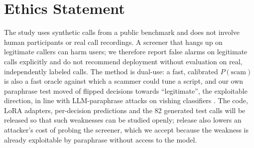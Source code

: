 \documentclass[11pt]{article}
\begin{document}
\section{Ethics Statement}

The study uses synthetic calls from a public benchmark and does not involve human participants or real call recordings. A screener that hangs up on legitimate callers can harm users; we therefore report false alarms on legitimate calls explicitly and do not recommend deployment without evaluation on real, independently labeled calls. The method is dual-use: a fast, calibrated $P(\text{scam})$ is also a fast oracle against which a scammer could tune a script, and our own paraphrase test moved \paratolegit{} of \paran{} flipped decisions towards ``legitimate'', the exploitable direction, in line with LLM-paraphrase attacks on vishing classifiers \citep{li2025phisher}. The code, LoRA adapters, per-decision predictions and the 82 generated test calls will be released so that such weaknesses can be studied openly; release also lowers an attacker's cost of probing the screener, which we accept because the weakness is already exploitable by paraphrase without access to the model.
\end{document}

